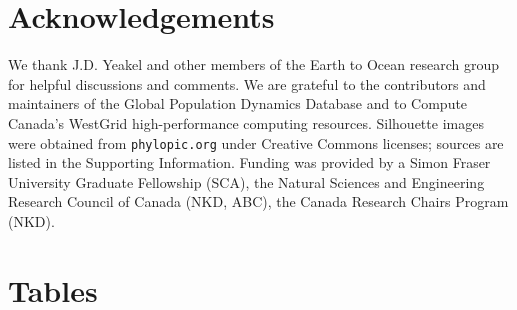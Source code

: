 \section{Acknowledgements}

We thank J.D. Yeakel and other members of the Earth to Ocean research
group for helpful discussions and comments. We are grateful to the
contributors and maintainers of the Global Population Dynamics Database and to
Compute Canada's WestGrid high-performance computing resources. Silhouette
images were obtained from \texttt{phylopic.org} under Creative Commons
licenses; sources are listed in the Supporting Information. Funding was
provided by a Simon Fraser University Graduate Fellowship (SCA), the Natural
Sciences and Engineering Research Council of Canada (NKD, ABC), the Canada
Research Chairs Program (NKD).

%
%
% 
% 
%

\section{Tables}



\clearpage

